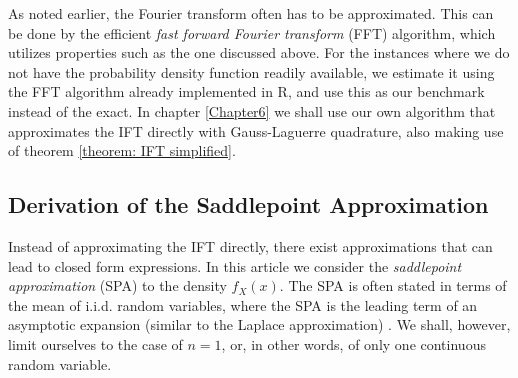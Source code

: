 As noted earlier, the Fourier transform often has to be approximated.
This can be done by the efficient \textit{fast forward Fourier transform} (FFT) algorithm, which utilizes properties such as the one discussed above.
For the instances where we do not have the probability density function readily available, we estimate it using the FFT algorithm already implemented in R, and use this as our benchmark instead of the exact.
In chapter \ref{Chapter6} we shall use our own algorithm that approximates the IFT directly with Gauss-Laguerre quadrature, also making use of theorem \ref{theorem: IFT simplified}.


\subsection{Derivation of the Saddlepoint Approximation}
\label{Chap3.2}

Instead of approximating the IFT directly, there exist approximations that can lead to closed form expressions.
In this article  we consider the \textit{saddlepoint approximation} (SPA) to the density $f_X(x)$.
The SPA is often stated in terms of the mean of i.i.d. random variables, where the SPA is the leading term of an asymptotic expansion (similar to the Laplace approximation) \citep{butler2007saddlepoint}.
We shall, however, limit ourselves to the case of $n=1$, or, in other words, of only one continuous random variable.

